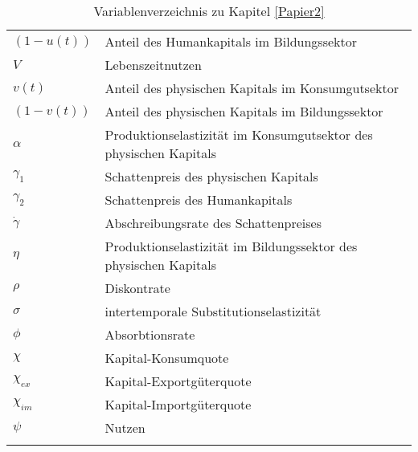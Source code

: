\begin{longtable}{l|l}
		$(1-u(t))$ & Anteil des Humankapitals im Bildungssektor\\%
		$V$ & Lebenszeitnutzen\\%
		$v(t)$ & Anteil des physischen Kapitals im Konsumgutsektor\\%
		$(1-v(t))$ & Anteil des physischen Kapitals im Bildungssektor\\%
		$\alpha$ & Produktionselastizität im Konsumgutsektor des physischen Kapitals\\%
		$\gamma_{1}$ & Schattenpreis des physischen Kapitals\\%
		$\gamma_{2}$ & Schattenpreis des Humankapitals\\%
		$\dot{\gamma}$ & Abschreibungsrate des Schattenpreises\\%
		$\eta$ & Produktionselastizität im Bildungssektor des physischen Kapitals\\%
		$\rho$ & Diskontrate\\%
		$\sigma$ & intertemporale Substitutionselastizität\\%
		$\phi$ & Absorbtionsrate\\%
		$\chi$ & Kapital-Konsumquote\\%
		$\chi_{ex}$ & Kapital-Exportgüterquote\\%
		$\chi_{im}$ & Kapital-Importgüterquote\\%
		$\psi$ & Nutzen \\%

\caption{Variablenverzeichnis zu Kapitel \ref{Papier2}}
\end{longtable}
